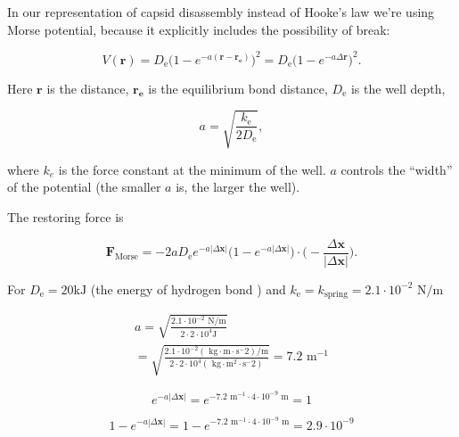 In our representation of capsid disassembly instead of Hooke's law we're using Morse potential, because it explicitly includes the possibility of break:

\begin{equation}
V(\mathbf{r}) = D_{\text{e}} \big(1 - e^{- a(\mathbf{r - r_e})}\big)^2 = D_{\text{e}} \big(1 - e^{- a \Delta \mathbf{r}}\big)^2.
\end{equation}

Here $\mathbf{r}$ is the distance, $\mathbf{r_e}$ is the equilibrium bond distance, $D_{\text{e}}$ is the well depth,

\begin{equation}
a=\sqrt {\frac{k_{\text{e}}}{2D_{\text{e}}}},
\end{equation}

where $k_e$ is the force constant at the minimum of the well. $a$ controls the ``width'' of the potential (the smaller $a$ is, the larger the well).

The restoring force is

\begin{equation}
\mathbf{F}_\text{Morse} = - 2a D_{\text{e}}e^{- a |\Delta \mathbf{x}|}\big(1 - e^{- a |\Delta \mathbf{x}|}\big) \cdot \big(- \frac{\Delta \mathbf{x}}{|\Delta \mathbf{x}|}\big).
\end{equation}

For $D_{\text{e}} = 20 \text{kJ}$ (the energy of hydrogen bond \cite{mcnaught1997compendium}) and $k_{\text{e}} = k_{\text{spring}} = 2.1 \cdot 10^{-2} \text{ N}/\text{m}$

\begin{equation}
\begin{split}
a = \sqrt {\frac{2.1 \cdot 10^{-2} \text{ N}/\text{m}}{2 \cdot 2 \cdot 10^{4} \text{J}}}\\
= \sqrt {\frac{2.1 \cdot 10^{-2} (\text{ kg} \cdot \text{m} \cdot \text{s}^-2)/\text{m}}{2 \cdot 2 \cdot 10^{4} (\text{ kg} \cdot \text{m}^2 \cdot \text{s}^-2)}} = 7.2 \text{ m}^{-1}
\end{split}
\end{equation}

\begin{equation}
e^{- a |\Delta \mathbf{x}|} = e^{- 7.2 \text{ m}^{-1} \cdot 4 \cdot 10^{-9} \text{ m}} = 1
\end{equation}

\begin{equation}
1 - e^{- a |\Delta \mathbf{x}|} = 1 - e^{- 7.2 \text{ m}^{-1} \cdot 4 \cdot 10^{-9} \text{ m}} = 2.9 \cdot 10^{-9}
\end{equation}

